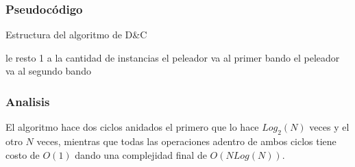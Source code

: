 \subsubsection{Pseudocódigo}
\begin{algorithm}[h!]
\caption{Estructura del algoritmo de D\&C}
\begin{algorithmic}[1]
		\State le resto 1 a la cantidad de instancias 
	\EndIf
            \State el peleador va al primer bando
        \Else
        	\State el peleador va al segundo bando
        \EndIf
        \EndFor 
	\EndFor
	\EndFunction
\end{algorithmic}
\end{algorithm}

\subsubsection{Analisis} 
El algoritmo hace dos ciclos anidados el primero que lo hace $Log_2(N)$ veces y el otro $N$ veces, mientras que todas las operaciones adentro de ambos ciclos tiene costo de $O(1)$ dando una complejidad final de $O(N Log(N))$.